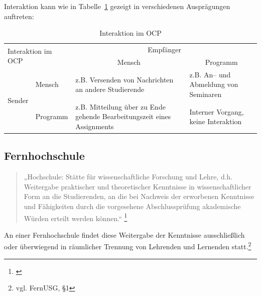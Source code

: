 Interaktion kann wie in Tabelle~\ref{tab:ocpinteractive} gezeigt in verschiedenen Ausprägungen auftreten:

\begin{table}[h]
\begin{tabular}{|l|l|m{4cm}|m{4cm}|}
\hline 
\multicolumn{2}{|l|}{\multirow{2}{*}{Interaktion im OCP}}                  & \multicolumn{2}{c|}{Empfänger}                                                                                 \\ \cline{3-4} 
\multicolumn{2}{|l|}{}                                   & \multicolumn{1}{c|}{Mensch}                                             & \multicolumn{1}{c|}{Programm}        \\ \hline
\multicolumn{1}{|c|}{\multirow{2}{*}{Sender}} & Mensch   & z.B. Versenden von Nachrichten an andere Studierende                    & z.B. An– und Abmeldung von Seminaren \\ \cline{2-4} 
\multicolumn{1}{|c|}{}                        & Programm & z.B. Mitteilung über zu Ende gehende Bearbeitungszeit eines Assignments & Interner Vorgang, keine Interaktion  \\ \hline
\end{tabular}
\caption{Interaktion im OCP}
\label{tab:ocpinteractive}
\end{table}


\subsection{Fernhochschule} %
\label{sub:hochschule}

\begin{quote}
„Hochschule: Stätte für wissenschaftliche Forschung und Lehre, d.h. Weitergabe praktischer und theoretischer Kenntnisse in wissenschaftlicher Form an die Studierenden, an die bei Nachweis der erworbenen Kenntnisse und Fähigkeiten durch die vorgesehene Abschlussprüfung akademische Würden erteilt werden können.“
\footnote{\cite{gabler:hochschule}}\end{quote}

An einer Fernhochschule findet diese Weitergabe der Kenntnisse ausschließlich oder überwiegend in räumlicher Trennung von Lehrenden und Lernenden statt.\footnote{vgl. FernUSG, §1}


